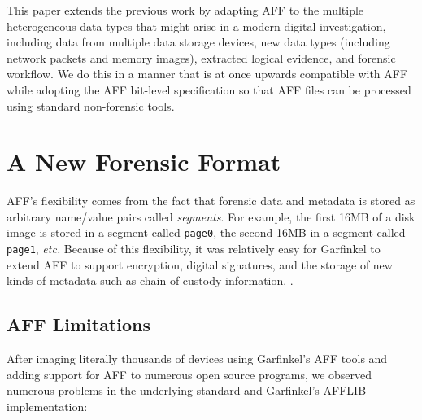 \documentclass[10pt, conference]{IEEEtran}
\begin{document}
This paper extends the previous work by adapting AFF to the multiple
heterogeneous data types that might arise in a modern digital
investigation, including data from multiple data storage devices, new
data types (including network packets and memory images), extracted
logical evidence, and forensic workflow. We do this in a manner that
is at once upwards compatible with AFF while adopting the AFF
bit-level specification so that AFF files can be processed using
standard non-forensic tools. 

\section{A New Forensic Format}

AFF's flexibility comes from the fact that forensic data and metadata
is stored as arbitrary name/value pairs called \emph{segments}. For example, the first 16MB
of a disk image is stored in a segment called \texttt{page0}, the
second 16MB in a segment called \texttt{page1}, \emph{etc.} Because of
this flexibility, it was
relatively easy for Garfinkel to extend AFF to support encryption,
digital signatures, and the storage of new kinds of metadata such as
chain-of-custody information\cite{garfinkel:affcrypto}. .

\subsection{AFF Limitations}
After imaging literally thousands of devices using Garfinkel's AFF
tools and adding support for AFF to numerous open source programs, we
observed numerous problems in the underlying standard
and Garfinkel's AFFLIB implementation:
\end{document}
